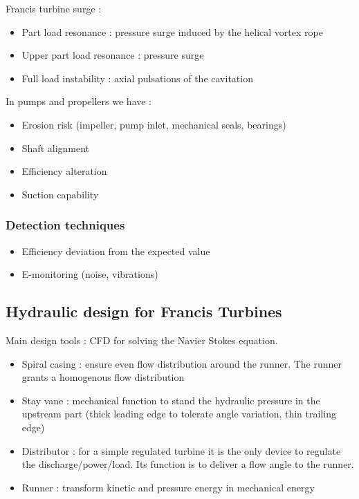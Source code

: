\documentclass[../main.tex]{subfiles}
\begin{document}
Francis turbine surge : \begin{itemize}
    \item Part load resonance : pressure surge induced by the helical vortex rope 
    \item Upper part load resonance : pressure surge
    \item Full load instability : axial pulsations of the cavitation
\end{itemize}

In pumps and propellers we have : \begin{itemize}
    \item Erosion risk (impeller, pump inlet, mechanical seals, bearings)
    \item Shaft alignment
    \item Efficiency alteration
    \item Suction capability
\end{itemize}

\subsubsection{Detection techniques}

\begin{itemize}
    \item Efficiency deviation from the expected value
    \item E-monitoring (noise, vibrations)
\end{itemize}

\subsection{Hydraulic design for Francis Turbines}

Main design tools : CFD for solving the Navier Stokes equation. \\

\begin{itemize}
    \item Spiral casing : ensure even flow distribution around the runner. The runner grants a homogenous flow distribution
    \item Stay vane : mechanical function to stand the hydraulic pressure in the upstream part (thick leading edge to tolerate angle variation, thin trailing edge)
    \item Distributor : for a simple regulated turbine it is the only device to regulate the discharge/power/load. Its function is to deliver a flow angle to the runner.
    \item Runner : transform kinetic and pressure energy in mechanical energy
\end{itemize}
\end{document}

